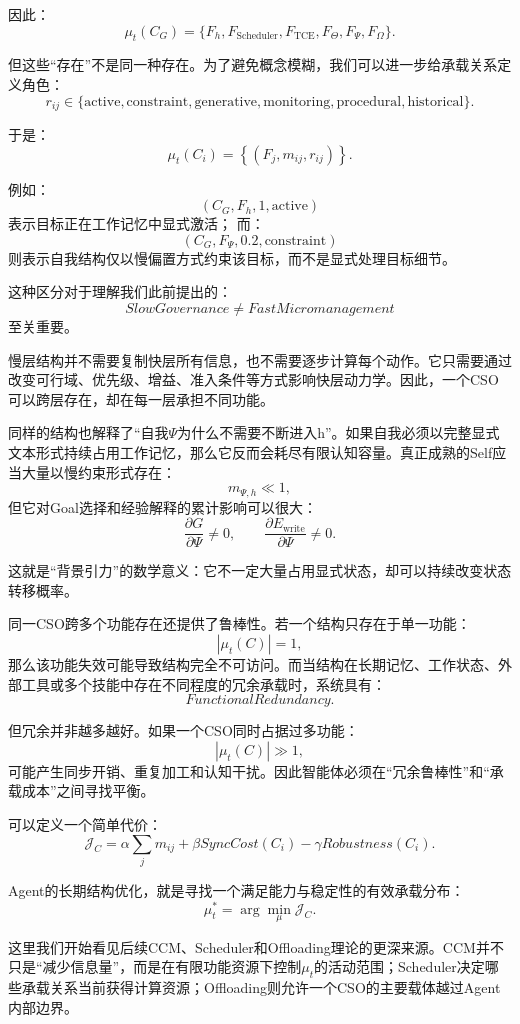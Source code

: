 因此：
\[
\mu_t(C_G)
=
\{
F_h,
F_{\text{Scheduler}},
F_{\text{TCE}},
F_\Theta,
F_\Psi,
F_\Omega
\}.
\]

但这些“存在”不是同一种存在。为了避免概念模糊，我们可以进一步给承载关系定义角色：
\[
r_{ij}
\in
\{
\text{active},
\text{constraint},
\text{generative},
\text{monitoring},
\text{procedural},
\text{historical}
\}.
\]

于是：
\[
\mu_t(C_i)
=
\left\{
(F_j,m_{ij},r_{ij})
\right\}.
\]

例如：
\[
(C_G,F_h,1,\text{active})
\]
表示目标正在工作记忆中显式激活；
而：
\[
(C_G,F_\Psi,0.2,\text{constraint})
\]
则表示自我结构仅以慢偏置方式约束该目标，而不是显式处理目标细节。

这种区分对于理解我们此前提出的：
\[
\boxed{
SlowGovernance\neq FastMicromanagement
}
\]
至关重要。

慢层结构并不需要复制快层所有信息，也不需要逐步计算每个动作。它只需要通过改变可行域、优先级、增益、准入条件等方式影响快层动力学。因此，一个CSO可以跨层存在，却在每一层承担不同功能。

同样的结构也解释了“自我$\Psi$为什么不需要不断进入h”。如果自我必须以完整显式文本形式持续占用工作记忆，那么它反而会耗尽有限认知容量。真正成熟的Self应当大量以慢约束形式存在：
\[
m_{\Psi,h}\ll1,
\]
但它对Goal选择和经验解释的累计影响可以很大：
\[
\frac{\partial G}{\partial\Psi}\neq0,
\qquad
\frac{\partial E_{\text{write}}}{\partial\Psi}\neq0.
\]

这就是“背景引力”的数学意义：它不一定大量占用显式状态，却可以持续改变状态转移概率。

同一CSO跨多个功能存在还提供了鲁棒性。若一个结构只存在于单一功能：
\[
|\mu_t(C)|=1,
\]
那么该功能失效可能导致结构完全不可访问。而当结构在长期记忆、工作状态、外部工具或多个技能中存在不同程度的冗余承载时，系统具有：
\[
FunctionalRedundancy.
\]

但冗余并非越多越好。如果一个CSO同时占据过多功能：
\[
|\mu_t(C)|\gg1,
\]
可能产生同步开销、重复加工和认知干扰。因此智能体必须在“冗余鲁棒性”和“承载成本”之间寻找平衡。

可以定义一个简单代价：
\[
\mathcal J_C
=
\alpha
\sum_jm_{ij}
+
\beta
SyncCost(C_i)
-
\gamma
Robustness(C_i).
\]

Agent的长期结构优化，就是寻找一个满足能力与稳定性的有效承载分布：
\[
\mu_t^*
=
\arg\min_{\mu}
\mathcal J_C.
\]

这里我们开始看见后续CCM、Scheduler和Offloading理论的更深来源。CCM并不只是“减少信息量”，而是在有限功能资源下控制$\mu_t$的活动范围；Scheduler决定哪些承载关系当前获得计算资源；Offloading则允许一个CSO的主要载体越过Agent内部边界。

